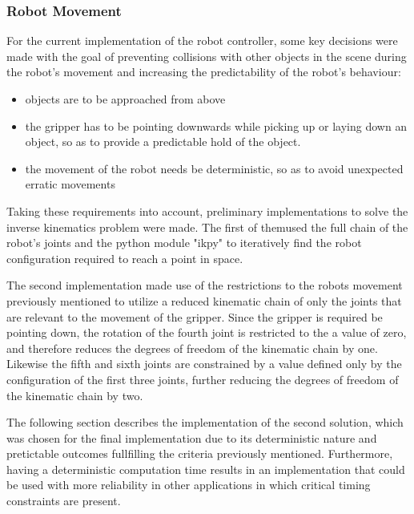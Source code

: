 \subsubsection{Robot Movement}

For the current implementation of the robot controller, some key decisions were made with the goal of preventing collisions with other objects in the scene during the robot's movement and increasing the predictability of the robot's behaviour:

\begin{itemize}
    \item objects are to be approached from above
    \item the gripper has to be pointing downwards while picking up or laying down an object, so as to provide a predictable hold of the object.
    \item the movement of the robot needs be deterministic, so as to avoid unexpected erratic movements
\end{itemize}

Taking these requirements into account, preliminary implementations to solve the inverse kinematics problem were made. The first of themused the full chain of the robot's joints and the python module "ikpy" to iteratively find the robot configuration required to reach a point in space.

The second implementation made use of the restrictions to the robots movement previously mentioned to utilize a reduced kinematic chain of only the joints that are relevant to the movement of the gripper.
Since the gripper is required be pointing down, the rotation of the fourth joint is restricted to the a value of zero, and therefore reduces the degrees of freedom of the kinematic chain by one. Likewise the fifth and sixth joints are constrained by a value defined only by the configuration of the first three joints, further reducing the degrees of freedom of the kinematic chain by two.

The following section describes the implementation of the second solution, which was chosen for the final implementation due to its deterministic nature and pretictable outcomes fullfilling the criteria previously mentioned. Furthermore, having a deterministic computation time results in an implementation that could be used with more reliability in other applications in which critical timing constraints are present.




